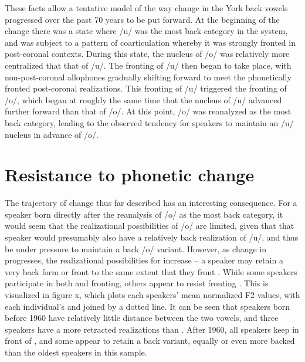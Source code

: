\documentclass[12pt]{article}
\begin{document}
These facts allow a tentative model of the way change in the York back vowels progressed over the past 70 years to be put forward. At the beginning of the change there was a state where /u/ was the most back category in the system, and was subject to a pattern of coarticulation whereby it was strongly fronted in post-coronal contexts. During this state, the nucleus of /o/ was relatively more centralized that that of /u/. The fronting of /u/ then began to take place, with non-post-coronal allophones gradually shifting forward to meet the phonetically fronted post-coronal realizations. This fronting of /u/ triggered the fronting of /o/, which began at roughly the same time that the nucleus of /u/ advanced further forward than that of /o/. At this point, /o/ was reanalyzed as the most back category, leading to the observed tendency for speakers to maintain an /u/ nucleus in advance of /o/.

\section{Resistance to phonetic change}

The trajectory of change thus far described has an interesting consequence. For a speaker born directly after the reanalysis of /o/ as the most back category, it would seem that the realizational possibilities of /o/ are limited, given that that speaker would presumably also have a relatively back realization of /u/, and thus be under pressure to maintain a back /o/ variant. However, as change in  progresses, the realizational possibilities for  increase -- a speaker may retain a very back form or front  to the same extent that they front . While some speakers participate in both  and  fronting, others appear to resist fronting . This is visualized in figure x, which plots each speakers' mean normalized F2 values, with each individual's  and  joined by a dotted line. It can be seen that speakers born before 1960 have relatively little distance between the two vowels, and three speakers have a more retracted  realizations than . After 1960, all speakers keep  in front of , and some appear to retain a back  variant, equally or even more backed than the oldest speakers in this sample.
\end{document}
